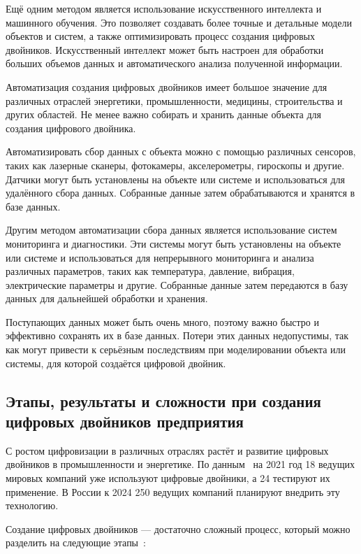 Ещё одним методом является использование искусственного интеллекта и машинного обучения. Это позволяет создавать более точные и детальные модели объектов и систем, а также оптимизировать процесс создания цифровых двойников. Искусственный интеллект может быть настроен для обработки больших объемов данных и автоматического анализа полученной информации.

Автоматизация создания цифровых двойников имеет большое значение для различных отраслей энергетики, промышленности, медицины, строительства и других областей. Не менее важно собирать и хранить данные объекта для создания цифрового двойника.

Автоматизировать сбор данных с объекта можно с помощью различных сенсоров, таких как лазерные сканеры, фотокамеры, акселерометры, гироскопы и другие. Датчики могут быть установлены на объекте или системе и использоваться для удалённого сбора данных. Собранные данные затем обрабатываются и хранятся в базе данных.

Другим методом автоматизации сбора данных является использование систем мониторинга и диагностики. Эти системы могут быть установлены на объекте или системе и использоваться для непрерывного мониторинга и анализа различных параметров, таких как температура, давление, вибрация, электрические параметры и другие. Собранные данные затем передаются в базу данных для дальнейшей обработки и хранения.

Поступающих данных может быть очень много, поэтому важно быстро и эффективно сохранять их в базе данных. Потери этих данных недопустимы, так как могут привести к серьёзным последствиям при моделировании объекта или системы, для которой создаётся цифровой двойник.

\subsection{Этапы, результаты и сложности при создания цифровых двойников предприятия}

С ростом цифровизации в различных отраслях растёт и развитие цифровых двойников в промышленности и энергетике. По данным~\cite{Habr1} на 2021 год 18 ведущих мировых компаний уже используют цифровые двойники, а 24 тестируют их применение. В России к 2024 250 ведущих компаний планируют внедрить эту технологию.

Создание цифровых двойников --- достаточно сложный процесс, который можно разделить на следующие этапы~\cite{Habr2}:

